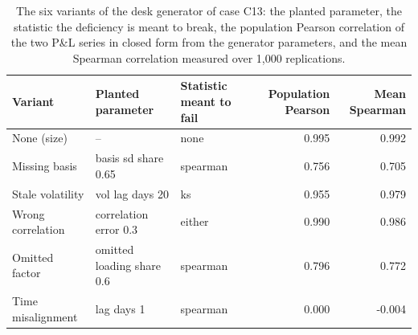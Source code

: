 \begin{table}[htbp]
\centering
\footnotesize
\setlength{\tabcolsep}{3.0pt}
\caption{The six variants of the desk generator of case C13: the planted parameter, the statistic the deficiency is meant to break, the population Pearson correlation of the two P\&L series in closed form from the generator parameters, and the mean Spearman correlation measured over 1,000 replications.}
\label{tab:market-truth}
\begin{tabular}{lp{4.0cm}lrr}
\toprule
Variant & Planted parameter & Statistic meant to fail & Population Pearson & Mean Spearman \\
\midrule
None (size) & -- & none & 0.995 & 0.992 \\
Missing basis & basis sd share 0.65 & spearman & 0.756 & 0.705 \\
Stale volatility & vol lag days 20 & ks & 0.955 & 0.979 \\
Wrong correlation & correlation error 0.3 & either & 0.990 & 0.986 \\
Omitted factor & omitted loading share 0.6 & spearman & 0.796 & 0.772 \\
Time misalignment & lag days 1 & spearman & 0.000 & -0.004 \\
\bottomrule
\end{tabular}
\end{table}
